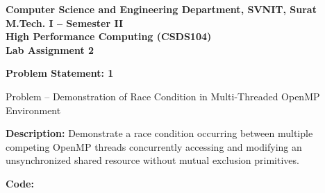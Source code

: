 \documentclass[12pt]{article}
\begin{document}

\begin{center}
\textbf{Computer Science and Engineering Department, SVNIT, Surat}\\
\textbf{M.Tech. I -- Semester II}\\
\textbf{High Performance Computing (CSDS104)}\\
\textbf{Lab Assignment 2}
\end{center}

\vspace{0.4cm}


\textbf{Problem Statement: 1}

Problem -- Demonstration of Race Condition in Multi-Threaded OpenMP Environment

\vspace{0.2cm}
\textbf{Description:} Demonstrate a race condition occurring between multiple competing OpenMP threads concurrently accessing and modifying an unsynchronized shared resource without mutual exclusion primitives.

\vspace{0.3cm}
\textbf{Code:}
\end{document}
